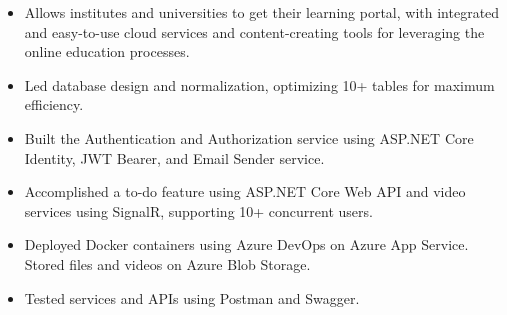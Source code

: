 
\begin{itemize}
    \item Allows institutes and universities to get their learning portal, with integrated and easy-to-use cloud services and content-creating tools for leveraging the online education processes.
    \item Led database design and normalization, optimizing 10+ tables for maximum efficiency.
    \item Built the Authentication and Authorization service using ASP.NET Core Identity, JWT Bearer, and Email Sender service.
    \item Accomplished a to-do feature using ASP.NET Core Web API and video services using SignalR, supporting 10+ concurrent users.
    \item Deployed Docker containers using Azure DevOps on Azure App Service. Stored files and videos on Azure Blob Storage.
    \item Tested services and APIs using Postman and Swagger.
\end{itemize}